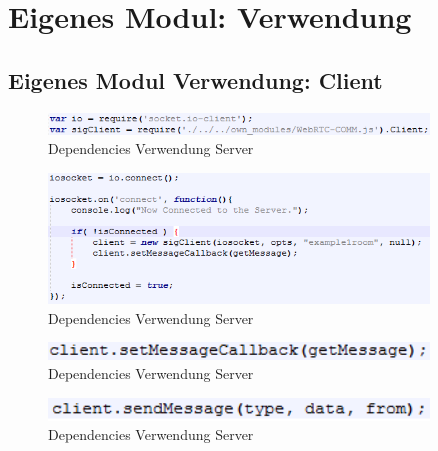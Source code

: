 \begin{description}
\end{description}


\section{Eigenes Modul: Verwendung}

\subsection{Eigenes Modul Verwendung: Client}
\begin{figure}[ht]
\centering
\includegraphics[width=0.9\textwidth]{backend/Modul_UserClientDependencies.PNG}
\caption{Dependencies Verwendung Server}
\label{backfig10}
\end{figure}

\begin{figure}[ht]
\centering
\includegraphics[width=0.9\textwidth]{backend/Modul_UserClientHowTo.PNG}
\caption{Dependencies Verwendung Server}
\label{backfig11}
\end{figure}

\begin{figure}[ht]
\centering
\includegraphics[width=0.9\textwidth]{backend/Modul_UserClientHowToMessageCallback.PNG}
\caption{Dependencies Verwendung Server}
\label{backfig12}
\end{figure}

\begin{figure}[ht]
\centering
\includegraphics[width=0.9\textwidth]{backend/Modul_UserClientHowToSendMessage.PNG}
\caption{Dependencies Verwendung Server}
\label{backfig13}
\end{figure}



